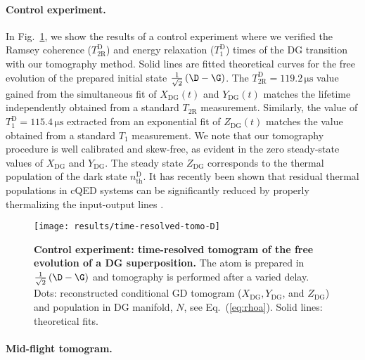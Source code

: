 \paragraph{Control experiment.}

In Fig.~\ref{fig:time-resolved-tomo-D}, we show the results of a
control experiment where we verified the Ramsey coherence ($T_{\mathrm{2R}}^{\mathrm{D}}$)
and energy relaxation ($T_{\mathrm{1}}^{\mathrm{D}}$) times of the
DG transition with our tomography method. Solid lines are fitted theoretical
curves for the free evolution of the prepared initial state $\frac{1}{\sqrt{2}}\left(\D-\G\right)$.
The $T_{\mathrm{2R}}^{\mathrm{D}}=119.2\,\mathrm{\mu s}$ value gained
from the simultaneous fit of $X_{\mathrm{DG}}(t)$ and $Y_{\mathrm{DG}}(t)$
matches the lifetime independently obtained from a standard $T_{\mathrm{2R}}$
measurement. Similarly, the value of $T_{\mathrm{1}}^{\mathrm{D}}=115.4\,\mathrm{\mu s}$
extracted from an exponential fit of $Z_{\mathrm{DG}}(t)$ matches
the value obtained from a standard $T_{\mathrm{1}}$ measurement.
We note that our tomography procedure is well calibrated and skew-free,
as evident in the zero steady-state values of $X_{\mathrm{DG}}$ and
$Y_{\mathrm{DG}}$. The steady state $Z_{\mathrm{DG}}$ corresponds
to the thermal population of the dark state $n_{\mathrm{th}}^{\mathrm{D}}$.
It has recently been shown that residual thermal populations in cQED
systems can be significantly reduced by properly thermalizing the
input-output lines \citep{Yeh2017Atten,Wang2019-cav-atten}.

\begin{figure}
\begin{centering}
\texttt{[image: results/time-resolved-tomo-D]}
\par\end{centering}
\caption[Control experiment: time-resolved tomogram of the free evolution of
a DG superposition]{\label{fig:time-resolved-tomo-D}\textbf{Control experiment: time-resolved
tomogram of the free evolution of a DG superposition. }The atom is
prepared in $\frac{1}{\sqrt{2}}\left(\D-\G\right)$ and tomography
is performed after a varied delay. Dots: reconstructed conditional
GD tomogram ($X_{\mathrm{DG}},Y_{\mathrm{DG}}$, and $Z_{\mathrm{DG}}$)
and population in DG manifold, $N$, see Eq.~(\ref{eq:rhoa}). Solid
lines: theoretical fits. }
\end{figure}


\paragraph{Mid-flight tomogram.}

